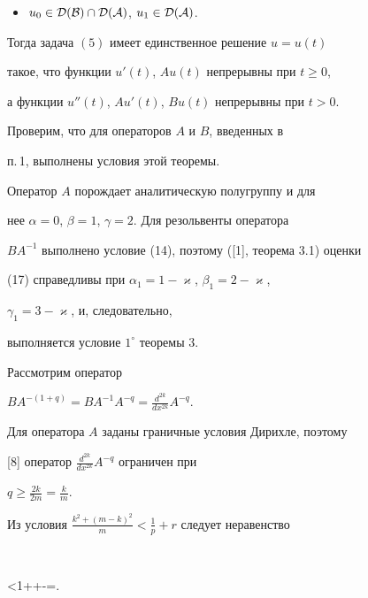 \begin{thm}
\begin{itemize}
$a=\max\{\alpha+\beta_1-1,\alpha_1+\beta-1\}$, 


$b=\max\{\alpha+\gamma_1-1,\alpha_1+\gamma-1\};$ 


\item[$4^\circ$.] $u_0\in\cal D(B)\cap\cal D(A)$, $u_1\in\cal D(A)$. 


\end{itemize} 


 


Тогда задача $(5)$ имеет единственное решение $u=u(t)$ 


такое, что функции $u'(t)$, $A u(t)$ непрерывны при $t\ge0$, 


а функции $u''(t)$, $A u'(t)$, $B u(t)$ непрерывны при $t>0$. 


\end{thm} 


 


Проверим, что для операторов $A$ и $B$, введенных в  


п.\,1, выполнены условия этой теоремы. 


 


Оператор $A$ порождает аналитическую полугруппу и для  


нее $\alpha=0$, $\beta=1$, $\gamma=2$. Для резольвенты оператора 


$BA^{-1}$ выполнено условие (14), поэтому ([1], теорема 3.1) оценки 


(17) справедливы при $\alpha_1=1-\varkappa$, $\beta_1=2-\varkappa$, 


$\gamma_1=3-\varkappa$, и, следовательно,  


выполняется условие $1^\circ$ теоремы 3. 


 


Рассмотрим оператор 


$B A^{-(1+q)}=B A^{-1}A^{-q}=\frac{d^{2k}}{d x^{2k}}A^{-q}$. 


Для оператора $A$ заданы граничные условия Дирихле, поэтому 


[8] оператор $\frac{d^{2k}}{d x^{2k}}A^{-q}$ ограничен при 


$q\ge\frac{2k}{2m}=\frac{k}{m}$. 


Из условия $\frac{k^2+(m-k)^2}{m}<\frac{1}{p}+r$ следует неравенство 


$$ 


<1++-=\varkappa. 


